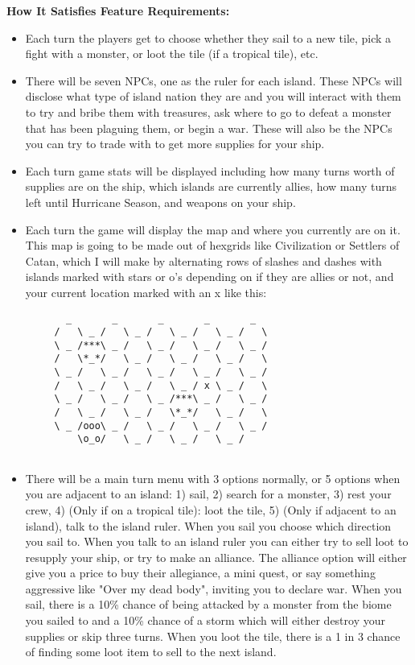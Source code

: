 \textbf{How It Satisfies Feature Requirements:}
\begin{itemize}
    \item Each turn the players get to choose whether they sail to a new tile, pick a fight with a monster, or loot the tile (if a tropical tile), etc.  
    \item There will be seven NPCs, one as the ruler for each island. These NPCs will disclose what type of island nation they are and you will interact with them to try and bribe them with treasures, ask where to go to defeat a monster that has been plaguing them, or begin a war. These will also be the NPCs you can try to trade with to get more supplies for your ship.
    \item Each turn game stats will be displayed including how many turns worth of supplies are on the ship, which islands are currently allies, how many turns left until Hurricane Season, and weapons on your ship.
    \item Each turn the game will display the map and where you currently are on it. This map is going to be made out of hexgrids like Civilization or Settlers of Catan, which I will make by alternating rows of slashes and dashes with islands marked with stars or o's depending on if they are allies or not, and your current location marked with an x like this:
    \begin{verbatim}
       _       _       _       _       _ 
     /   \ _ /   \ _ /   \ _ /   \ _ /   \
     \ _ /***\ _ /   \ _ /   \ _ /   \ _ /
     /   \*_*/   \ _ /   \ _ /   \ _ /   \
     \ _ /   \ _ /   \ _ /   \ _ /   \ _ /
     /   \ _ /   \ _ /   \ _ / x \ _ /   \
     \ _ /   \ _ /   \ _ /***\ _ /   \ _ /
     /   \ _ /   \ _ /   \*_*/   \ _ /   \
     \ _ /ooo\ _ /   \ _ /   \ _ /   \ _ /
         \o_o/   \ _ /   \ _ /   \ _ /   
        
    \end{verbatim}
    \item There will be a main turn menu with 3 options normally, or 5 options when you are adjacent to an island: 1) sail, 2) search for a monster, 3) rest your crew, 4) (Only if on a tropical tile): loot the tile, 5) (Only if adjacent to an island), talk to the island ruler. When you sail you choose which direction you sail to. When you talk to an island ruler you can either try to sell loot to resupply your ship, or try to make an alliance. The alliance option will either give you a price to buy their allegiance, a mini quest, or say something aggressive like "Over my dead body", inviting you to declare war. When you sail, there is a 10\% chance of being attacked by a monster from the biome you sailed to and a 10\% chance of a storm which will either destroy your supplies or skip three turns. When you loot the tile, there is a 1 in 3 chance of finding some loot item to sell to the next island. 
\end{itemize}

